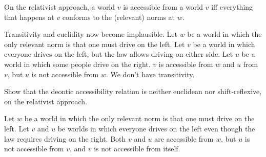 On the relativist approach, a world $v$ is accessible from a world $v$ iff
everything that happens at $v$ conforms to the (relevant) norms at $w$.

Transitivity and euclidity now become implausible. Let $w$ be a world in which
the only relevant norm is that one must drive on the left. Let $v$ be a world in
which everyone drives on the left, but the law allows driving on either side.
Let $u$ be a world in which some people drive on the right. $v$ is accessible
from $w$ and $u$ from $v$, but $u$ is not accessible from $w$. We don't have
transitivity. 

\begin{exercise}
  Show that the deontic accessibility relation is neither euclidean nor
  shift-reflexive, on the relativist approach.
\end{exercise}
\begin{solution}
  Let $w$ be a world in which the only relevant norm is that one must drive on
  the left. Let $v$ and $u$ be worlds in which everyone drives on the left even
  though the law requires driving on the right. Both $v$ and $u$ are accessible
  from $w$, but $u$ is not accessible from $v$, and $v$ is not accessible from
  itself.
\end{solution}


